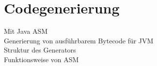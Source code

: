 \chapter{Codegenerierung}

Mit Java ASM\\
Generierung von ausführbarem Bytecode für JVM\\
Struktur des Generators\\
Funktionsweise von ASM\\